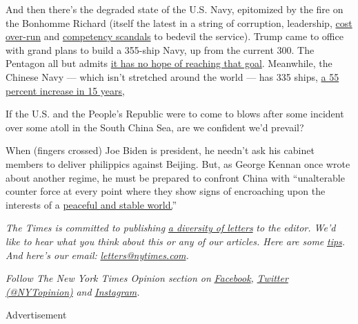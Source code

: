 And then there's the degraded state of the U.S. Navy, epitomized by the
fire on the Bonhomme Richard (itself the latest in a string of
corruption, leadership,
\href{https://news.usni.org/2020/07/02/navy-removes-ford-carrier-program-manager-citing-performance-over-time}{cost
over-run} and
\href{https://www.navytimes.com/news/your-navy/2019/01/14/worse-than-you-thought-inside-the-secret-fitzgerald-probe-the-navy-doesnt-want-you-to-read/}{competency
scandals} to bedevil the service). Trump came to office with grand plans
to build a 355-ship Navy, up from the current 300. The Pentagon all but
admits
\href{https://breakingdefense.com/2020/02/navy-marines-caught-by-surprise-by-espers-budget-cuts/}{it
has no hope of reaching that goal}. Meanwhile, the Chinese Navy ---
which isn't stretched around the world --- has 335 ships,
\href{https://www.nationaldefensemagazine.org/articles/2020/3/9/eagle-vs-dragon-how-the-us-and-chinese-navies-stack-up}{a
55 percent increase in 15 years},

If the U.S. and the People's Republic were to come to blows after some
incident over some atoll in the South China Sea, are we confident we'd
prevail?

When (fingers crossed) Joe Biden is president, he needn't ask his
cabinet members to deliver philippics against Beijing. But, as George
Kennan once wrote about another regime, he must be prepared to confront
China with ``unalterable counter force at every point where they show
signs of encroaching upon the interests of a
\href{https://www.foreignaffairs.com/articles/russian-federation/1947-07-01/sources-soviet-conduct}{peaceful
and stable world.}''

\emph{The Times is committed to publishing}
\href{https://www.nytimes.com/2019/01/31/opinion/letters/letters-to-editor-new-york-times-women.html}{\emph{a
diversity of letters}} \emph{to the editor. We'd like to hear what you
think about this or any of our articles. Here are some}
\href{https://help.nytimes.com/hc/en-us/articles/115014925288-How-to-submit-a-letter-to-the-editor}{\emph{tips}}\emph{.
And here's our email:}
\href{mailto:letters@nytimes.com}{\emph{letters@nytimes.com}}\emph{.}

\emph{Follow The New York Times Opinion section on}
\href{https://www.facebook.com/nytopinion}{\emph{Facebook}}\emph{,}
\href{http://twitter.com/NYTOpinion}{\emph{Twitter (@NYTopinion)}}
\emph{and}
\href{https://www.instagram.com/nytopinion/}{\emph{Instagram}}\emph{.}

Advertisement

